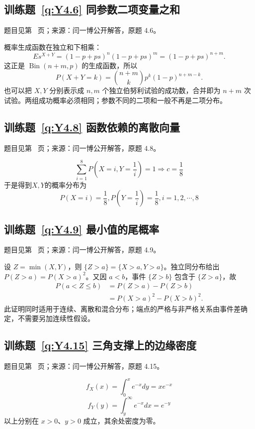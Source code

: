 \documentclass[UTF8,12pt,a4paper,fontset=fandol]{ctexbook}
\begin{document}
\subsection*{训练题~\ref{q:Y4.6} 同参数二项变量之和}\label{a:Y4.6}{\small 题目见第~\pageref{q:Y4.6} 页；来源：闫一博公开解答，原题 4.6。}
\begin{solve}概率生成函数在独立和下相乘：\[E s^{X+Y}=(1-p+ps)^n(1-p+ps)^m=(1-p+ps)^{n+m}.\]这正是 $\operatorname{Bin}(n+m,p)$ 的生成函数，所以\[P(X+Y=k)=\binom{n+m}{k}p^k(1-p)^{n+m-k}.\]也可以把 $X,Y$ 分别表示成 $n,m$ 个独立伯努利试验的成功数，合并即为 $n+m$ 次试验。两组成功概率必须相同；参数不同的二项和一般不再是二项分布。\end{solve}

\subsection*{训练题~\ref{q:Y4.8} 函数依赖的离散向量}\label{a:Y4.8}{\small 题目见第~\pageref{q:Y4.8} 页；来源：闫一博公开解答，原题 4.8。}
\begin{solve}
    \[\sum\limits_{i = 1}^8 {P(X = i,Y = \frac{1}{i})}  = 1 \Rightarrow c = \frac{1}{8}\]
    于是得到$X,Y$的概率分布为
    \[P(X = i) = \frac{1}{8},P(Y = \frac{1}{i}) = \frac{1}{8},i = 1,2, \cdots ,8\]
\end{solve}

\subsection*{训练题~\ref{q:Y4.9} 最小值的尾概率}\label{a:Y4.9}{\small 题目见第~\pageref{q:Y4.9} 页；来源：闫一博公开解答，原题 4.9。}
\begin{solve}设 $Z=\min(X,Y)$，则 $\{Z>a\}=\{X>a,Y>a\}$。独立同分布给出 $P(Z>a)=P(X>a)^2$。又因 $a<b$，事件 $\{Z>b\}$ 包含于 $\{Z>a\}$，故\[\begin{aligned}P(a<Z\le b)&=P(Z>a)-P(Z>b)\\&=P(X>a)^2-P(X>b)^2.\end{aligned}\]此证明同时适用于连续、离散和混合分布；端点的严格与非严格关系由事件差确定，不需要另加连续性假设。\end{solve}

\subsection*{训练题~\ref{q:Y4.15} 三角支撑上的边缘密度}\label{a:Y4.15}{\small 题目见第~\pageref{q:Y4.15} 页；来源：闫一博公开解答，原题 4.15。}
\begin{solve}
\[{f_X}(x) = \int_0^x {{e^{ - x}}dy}  = x{e^{ - x}}\]
    \[{f_Y}(y) = \int_y^\infty  {{e^{ - x}}dx}  = {e^{ - y}}\]
 以上分别在 $x>0$、$y>0$ 成立，其余处密度为零。\end{solve}
\end{document}
